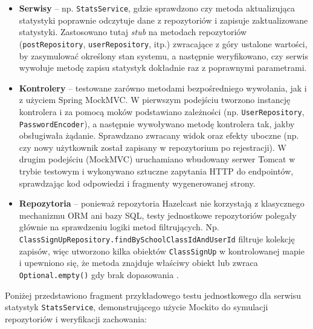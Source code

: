 \begin{itemize}
\item \textbf{Serwisy} – np. \texttt{StatsService}, gdzie sprawdzono czy metoda aktualizująca statystyki poprawnie odczytuje dane z repozytoriów i zapisuje zaktualizowane statystyki. Zastosowano tutaj \textit{stub} na metodach repozytoriów \cite{mockito-docs, junit-docs}(\texttt{postRepository}, \texttt{userRepository}, itp.) zwracające z góry ustalone wartości, by zasymulować określony stan systemu, a następnie weryfikowano, czy serwis wywołuje metodę zapisu statystyk dokładnie raz z poprawnymi parametrami.
\item \textbf{Kontrolery} – testowane zarówno metodami bezpośredniego wywołania, jak i z użyciem Spring MockMVC. W pierwszym podejściu tworzono instancję kontrolera i za pomocą moków podstawiano zależności (np. \texttt{UserRepository}, \texttt{PasswordEncoder}), a następnie wywoływano metodę kontrolera tak, jakby obsługiwała żądanie. Sprawdzano zwracany widok oraz efekty uboczne (np. czy nowy użytkownik został zapisany w repozytorium po rejestracji). W drugim podejściu (MockMVC) uruchamiano wbudowany serwer Tomcat w trybie testowym i wykonywano sztuczne zapytania HTTP do endpointów, sprawdzając kod odpowiedzi i fragmenty wygenerowanej strony. \cite{spring-docs}
\item \textbf{Repozytoria} – ponieważ repozytoria Hazelcast nie korzystają z klasycznego mechanizmu ORM ani bazy SQL, testy jednostkowe repozytoriów polegały głównie na sprawdzeniu logiki metod filtrujących. Np. \texttt{ClassSignUpRepository.findBySchoolClassIdAndUserId} filtruje kolekcję zapisów, więc utworzono kilka obiektów \texttt{ClassSignUp} w kontrolowanej mapie i upewniono się, że metoda znajduje właściwy obiekt lub zwraca \texttt{Optional.empty()} gdy brak dopasowania \cite{hazelcast-docs}.
\end{itemize}
Poniżej przedstawiono fragment przykładowego testu jednostkowego dla serwisu statystyk \texttt{StatsService}, demonstrującego użycie Mockito do symulacji repozytoriów i weryfikacji zachowania:
